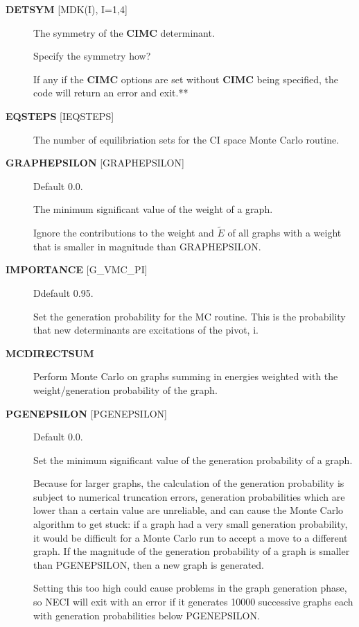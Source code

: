 \documentclass[openany,a4paper,10pt]{manual}
\begin{document}
\begin{description}
\item[\textbf{DETSYM} {[}MDK(I), I=1,4{]}]
The symmetry of the \textbf{CIMC} determinant.

\begin{notice}[note]
Specify the symmetry how?
\end{notice}

\begin{notice}[note]
If any if the \textbf{CIMC} options are set without \textbf{CIMC} being
specified, the code will return an error and exit.**
\end{notice}

\item[\textbf{EQSTEPS} {[}IEQSTEPS{]}]
The number of equilibriation sets for the CI space Monte Carlo routine.

\item[\textbf{GRAPHEPSILON} {[}GRAPHEPSILON{]}]
Default 0.0.

The minimum significant value of the weight of a graph.

Ignore the contributions to the weight and $\tilde{E}$ of all
graphs with a weight that is smaller in magnitude than GRAPHEPSILON.

\item[\textbf{IMPORTANCE} {[}G\_VMC\_PI{]}]
Ddefault 0.95.

Set the generation probability for the MC routine.  This is the
probability that new determinants are excitations of the pivot, i.

\item[\textbf{MCDIRECTSUM}]
Perform Monte Carlo on graphs summing in energies weighted with the
weight/generation probability of the graph.

\item[\textbf{PGENEPSILON} {[}PGENEPSILON{]}]
Default 0.0.

Set the minimum significant value of the generation probability of a graph.

Because for larger graphs, the calculation of the generation
probability is subject to numerical truncation errors, generation
probabilities which are lower than a certain value are unreliable,
and can cause the Monte Carlo algorithm to get stuck: if a graph had a
very small generation probability, it would be difficult for a Monte
Carlo run to accept a move to a different graph.  If the magnitude
of the generation probability of a graph is smaller than PGENEPSILON,
then a new graph is generated.

Setting this too high could cause problems in the graph generation phase,
so NECI will exit with an error if it generates 10000 successive
graphs each with generation probabilities below PGENEPSILON.


\end{description}
\end{document}
